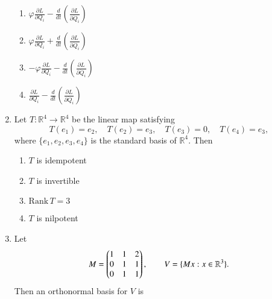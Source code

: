 \documentclass[journal,12pt,onecolumn]{IEEEtran}
\theoremstyle{remark}
\begin{document}
\begin{enumerate}
\begin{enumerate}
\item $\varphi \frac{\partial L}{\partial Q_i} - \frac{d}{dt} \left( \frac{\partial L}{\partial \dot{Q}_i} \right)$
\item $\varphi \frac{\partial L}{\partial Q_i} + \frac{d}{dt} \left( \frac{\partial L}{\partial \dot{Q}_i} \right)$
\item $- \varphi \frac{\partial L}{\partial Q_i} - \frac{d}{dt} \left( \frac{\partial L}{\partial \dot{Q}_i} \right)$
\item $\frac{\partial L}{\partial Q_i} - \frac{d}{dt} \left( \frac{\partial L}{\partial \dot{Q}_i} \right)$
\end{enumerate}

\item Let $T: \mathbb{R}^4 \to \mathbb{R}^4$ be the linear map satisfying
\[
T(e_1) = e_2, \quad T(e_2) = e_3, \quad T(e_3) = 0, \quad T(e_4) = e_3,
\]
where $\{ e_1, e_2, e_3, e_4 \}$ is the standard basis of $\mathbb{R}^4$. Then
\\[-0.3em]\makebox[\textwidth][r]{\textit{[GATE EE 2025]}}

\begin{enumerate}
\item $T$ is idempotent
\item $T$ is invertible
\item $\mathrm{Rank}\,T = 3$
\item $T$ is nilpotent
\end{enumerate}




\item Let
\[
M=\begin{pmatrix}
1 & 1 & 2\\
0 & 1 & 1\\
0 & 1 & 1
\end{pmatrix}, \qquad
V=\{Mx : x\in\mathbb{R}^3\}.
\]
Then an orthonormal basis for \(V\) is
\\[-0.3em]\makebox[\textwidth][r]{\textit{[GATE EE 2025]}}


\end{enumerate}
\end{document}
